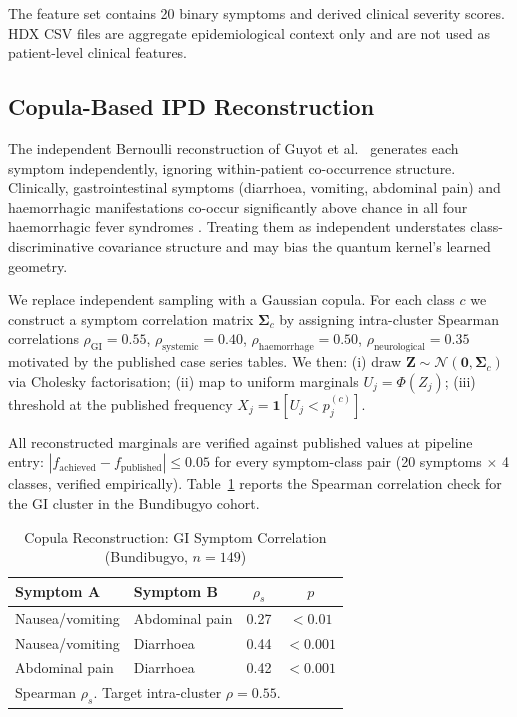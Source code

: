 \documentclass[11pt]{article}
\begin{document}
The feature set contains 20 binary symptoms and derived clinical severity scores. HDX CSV files are aggregate epidemiological context only and are not used as patient-level clinical features.

\subsection{Copula-Based IPD Reconstruction}
\label{sec:copula}

The independent Bernoulli reconstruction of Guyot et al.\
\cite{guyot2012} generates each symptom independently, ignoring
within-patient co-occurrence structure. Clinically, gastrointestinal
symptoms (diarrhoea, vomiting, abdominal pain) and haemorrhagic
manifestations co-occur significantly above chance in all four
haemorrhagic fever syndromes \cite{schieffelin2014, macneil2010,
roddy2012}. Treating them as independent understates
class-discriminative covariance structure and may bias the quantum
kernel's learned geometry.

We replace independent sampling with a Gaussian copula. For each
class $c$ we construct a symptom correlation matrix $\boldsymbol{\Sigma}_c$
by assigning intra-cluster Spearman correlations
$\rho_{\text{GI}} = 0.55$,
$\rho_{\text{systemic}} = 0.40$,
$\rho_{\text{haemorrhage}} = 0.50$,
$\rho_{\text{neurological}} = 0.35$
motivated by the published case series tables. We then: (i) draw
$\mathbf{Z} \sim \mathcal{N}(\mathbf{0}, \boldsymbol{\Sigma}_c)$ via
Cholesky factorisation; (ii) map to uniform marginals
$U_j = \Phi(Z_j)$; (iii) threshold at the published frequency
$X_j = \mathbf{1}[U_j < p_j^{(c)}]$.

All reconstructed marginals are verified against published values at
pipeline entry: $|f_{\text{achieved}} - f_{\text{published}}| \leq 0.05$
for every symptom-class pair (20 symptoms $\times$ 4 classes, verified
empirically). Table~\ref{tab:copula_check} reports the Spearman
correlation check for the GI cluster in the Bundibugyo cohort.

\begin{table}[htbp]
\caption{Copula Reconstruction: GI Symptom Correlation (Bundibugyo, $n=149$)}
\label{tab:copula_check}
\begin{center}
\renewcommand{\arraystretch}{1.20}
\begin{tabular}{llcc}
\toprule
\textbf{Symptom A} & \textbf{Symptom B} & $\rho_s$ & $p$ \\
\midrule
Nausea/vomiting & Abdominal pain & 0.27 & $<0.01$ \\
Nausea/vomiting & Diarrhoea      & 0.44 & $<0.001$ \\
Abdominal pain  & Diarrhoea      & 0.42 & $<0.001$ \\
\bottomrule
\multicolumn{4}{l}{\footnotesize Spearman $\rho_s$. Target intra-cluster $\rho = 0.55$.}
\end{tabular}
\end{center}
\end{table}
\end{document}
